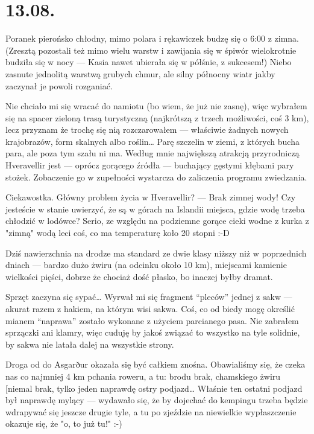 \chapter*{13.08.}

Poranek pierońsko chłodny, mimo polara i rękawiczek budzę się o 6:00 z zimna. (Zresztą pozostali też mimo wielu warstw i zawijania się w śpiwór wielokrotnie budziła się w nocy --- Kasia nawet ubierała się w półśnie, z sukcesem!) Niebo zasnute jednolitą warstwą grubych chmur, ale silny północny wiatr jakby zaczynał je powoli rozganiać.

Nie chciało mi się wracać do namiotu (bo wiem, że już nie zasnę), więc wybrałem się na spacer zieloną trasą turystyczną (najkrótszą z trzech możliwości, coś 3 km), lecz przyznam że trochę się nią rozczarowałem --- właściwie żadnych nowych krajobrazów, form skalnych albo roślin… Parę szczelin w ziemi, z których bucha para, ale poza tym szału ni ma. Według mnie największą atrakcją przyrodniczą Hveravellir jest --- oprócz gorącego źródła --- buchający gęstymi kłębami pary stożek. Zobaczenie go w zupełności wystarcza do zaliczenia programu zwiedzania.

Ciekawostka. Główny problem życia w Hveravellir? --- Brak zimnej wody! Czy jesteście w stanie uwierzyć, że są w górach na Islandii miejsca, gdzie wodę trzeba chłodzić w lodówce? Serio, ze względu na podziemne gorące cieki wodne z kurka z "zimną" wodą leci coś, co ma temperaturę koło 20 stopni :-D

Dziś nawierzchnia na drodze ma standard ze dwie klasy niższy niż w poprzednich dniach --- bardzo dużo żwiru (na odcinku około 10 km), miejscami kamienie wielkości pięści, dobrze że chociaż dość płasko, bo inaczej byłby dramat.


Sprzęt zaczyna się sypać… Wyrwał mi się fragment “pleców” jednej z sakw --- akurat razem z hakiem, na którym wisi sakwa. Coś, co od biedy mogę określić mianem “naprawa” zostało wykonane z użyciem parcianego pasa. Nie zabrałem sprzączki ani klamry, więc cuduję by jakoś związać to wszystko na tyle solidnie, by sakwa nie latała dalej na wszystkie strony.

Droga od  do Asgarður okazała się być całkiem znośna. Obawialiśmy się, że czeka nas co najmniej 4 km pchania roweru, a tu: brodu brak, chamskiego żwiru [niemal brak, tylko jeden naprawdę ostry podjazd… Właśnie ten ostatni podjazd był naprawdę mylący --- wydawało się, że by dojechać do kempingu trzeba będzie wdrapywać się jeszcze drugie tyle, a tu po zjeździe na niewielkie wypłaszczenie okazuje się, że "o, to już tu!" :-)


